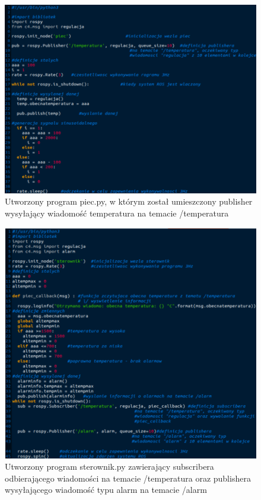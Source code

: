 \documentclass[10pt,a4paper,twoside,twocolumn]{article}%
\begin{document}
\begin{figure}[H]
    \centering
    \includegraphics[width=\linewidth]{4.png}
    \caption{Utworzony program piec.py, w którym został umieszczony
    publisher wysyłający wiadomość temperatura na temacie /temperatura}
\end{figure}

\begin{figure}[H]
    \centering
    \includegraphics[width=\linewidth]{5.png}
    \caption{Utworzony program sterownik\@.py zawierający subscribera
    odbierającego wiadomości na temacie /temperatura oraz publishera
    wysyłającego wiadomość typu alarm na temacie /alarm}
\end{figure}
\end{document}
